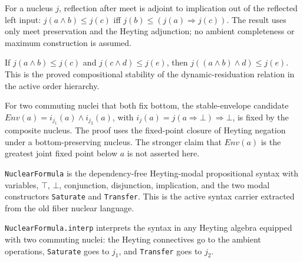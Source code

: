 \begin{theorem}\label{thm:nucleus-dynamic-residuation}\leanok{}
For a nucleus $j$, reflection after meet is adjoint to implication out of the
reflected left input:
$j(a\wedge b)\leq j(c)$ iff $j(b)\leq (j(a)\Rightarrow j(c))$.
The result uses only meet preservation and the Heyting adjunction; no ambient
completeness or maximum construction is assumed.
\end{theorem}
\begin{theorem}\label{thm:nucleus-dynamic-residuation-stability}\leanok{}
If $j(a\wedge b)\leq j(c)$ and $j(c\wedge d)\leq j(e)$, then
$j((a\wedge b)\wedge d)\leq j(e)$. This is the proved compositional stability
of the dynamic-residuation relation in the active order hierarchy.
\end{theorem}
\begin{theorem}\label{thm:nucleus-stable-envelope-fixed}\leanok{}
For two commuting nuclei that both fix bottom, the stable-envelope candidate
$Env(a)=i_{j_1}(a)\wedge i_{j_2}(a)$, with $i_j(a)=j(a\Rightarrow \bot)\Rightarrow\bot$,
is fixed by the composite nucleus. The proof uses the fixed-point closure of
Heyting negation under a bottom-preserving nucleus. The stronger claim that
$Env(a)$ is the greatest joint fixed point below $a$ is not asserted here.
\end{theorem}
\begin{proposition}\label{thm:nuclear-formula-syntax}\leanok{}
\texttt{NuclearFormula} is the dependency-free Heyting-modal propositional
syntax with variables, $\top$, $\bot$, conjunction, disjunction, implication,
and the two modal constructors \texttt{Saturate} and \texttt{Transfer}. This is
the active syntax carrier extracted from the old fiber nuclear language.
\end{proposition}
\begin{proposition}\label{thm:nuclear-formula-interpretation}\leanok{}
\texttt{NuclearFormula.interp} interprets the syntax in any Heyting algebra
equipped with two commuting nuclei: the Heyting connectives go to the ambient
operations, \texttt{Saturate} goes to $j_1$, and \texttt{Transfer} goes to $j_2$.
\end{proposition}
